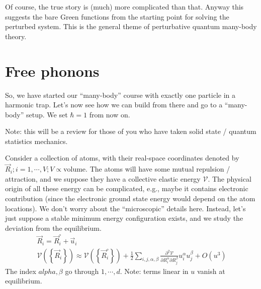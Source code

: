 Of course, the true story is (much) more complicated than that. Anyway this suggests the bare Green functions from the starting point for solving the perturbed system. This is the general theme of perturbative quantum many-body theory.

\section{Free phonons}

So, we have started our ``many-body'' course with exactly one particle in a harmonic trap. Let's now see how we can build from there and go to a ``many-body'' setup. We set $\hbar=1$ from now on.

Note: this will be a review for those of you who have taken solid state / quantum statistics mechanics.

Consider a collection of atoms, with their real-space coordinates denoted by $\vec{R}_i;i=1,\cdots,V;V\propto \text{volume}$. The atoms will have some mutual repulsion / attraction, and we suppose they have a collective elastic energy $\mathcal{V}$. The physical origin of all these energy can be complicated, e.g., maybe it contains electronic contribution (since the electronic ground state energy would depend on the atom locations). We don't worry about the ``microscopic'' details here. Instead, let's just suppose a stable minimum energy configuration exists, and we study the deviation from the equilibrium.
\begin{gather*}
    \vec{R}_i=\vec{R}_{i}^{\circ}+\vec{u}_i\\
    \mathcal{V} \left( \left\{ \vec{R}_i \right\} \right) \approx \mathcal{V} \left( \left\{ \vec{R}_{i}^{\circ} \right\} \right) +\frac{1}{2}\sum_{i,j,\alpha ,\beta}{\frac{\partial ^2\mathcal{V}}{\partial R_{i}^{\alpha}\partial R_{j}^{\beta}}u_{i}^{\alpha}u_{j}^{\beta}}+O\left( u^3 \right)
\end{gather*}
The index $alpha,\beta$ go through $1,\cdots,d$.
Note: terms linear in $u$ vanish at equilibrium.

